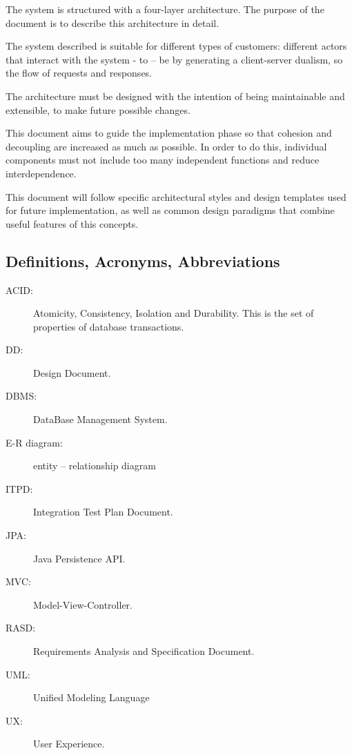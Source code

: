 \documentclass{article}
\begin{document}
	The system is structured with a four-layer architecture. The purpose of the document is to describe this architecture in detail.

	\bigskip
	The system described is suitable for different types of customers: different actors that interact with the system - to – be by generating a client-server dualism, so the flow of requests and responses.
	
	The architecture must be designed with the intention of being maintainable and extensible, to make future possible changes.
	
	\bigskip
	This document aims to guide the implementation phase so that cohesion and decoupling are increased as much as possible. In order to do this, individual components must not include too many independent functions and reduce interdependence.
	
	This document will follow specific architectural styles and design templates used for future implementation, as well as common design paradigms that combine useful features of this concepts.


	
	\subsection{Definitions, Acronyms, Abbreviations}
	\begin{description}
	\item [ACID:] Atomicity, Consistency, Isolation and Durability. This is the set of properties of database transactions.
	\item [DD:] Design Document.
	\item [DBMS:] DataBase Management System.
	\item [E-R diagram:] entity – relationship diagram
	\item [ITPD:] Integration Test Plan Document.
	\item [JPA:] Java Persistence API.
	\item [MVC:] Model-View-Controller.
	\item [RASD:] Requirements Analysis and Specification Document.
	\item [UML:] Unified Modeling Language
	\item [UX:] User Experience.
	\end{description}
	
	
\end{document}
